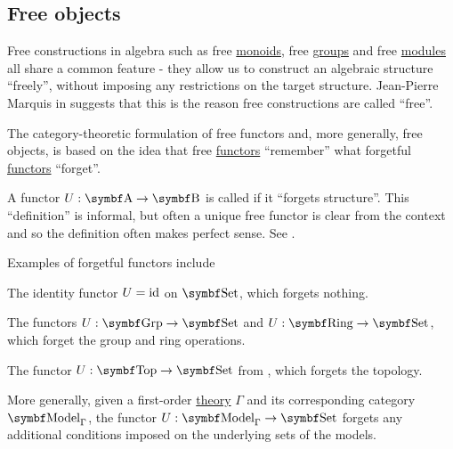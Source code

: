 \subsection{Free objects}\label{subsec:free_objects}

\begin{remark}\label{remark:free_construction_etymology}
  Free constructions in algebra such as free \hyperref[def:free_monoid]{monoids}, free \hyperref[def:free_group]{groups} and free \hyperref[def:free_left_module]{modules} all share a common feature - they allow us to construct an algebraic structure \enquote{freely}, without imposing any restrictions on the target structure. Jean-Pierre Marquis in \cite{StanfordPlato:category_theory} suggests that this is the reason free constructions are called \enquote{free}.

  The category-theoretic formulation of free functors and, more generally, free objects, is based on the idea that free \hyperref[def:free_functor]{functors} \enquote{remember} what forgetful \hyperref[def:forgetful_functor]{functors} \enquote{forget}.
\end{remark}

\begin{definition}\label{def:forgetful_functor}\cite[examples 1.2.3]{Leinster2014}
  A functor \( U: \Cat{A} \to \Cat{B} \) is called  if it \enquote{forgets structure}. This \enquote{definition} is informal, but often a unique free functor is clear from the context and so the definition often makes perfect sense. See .
\end{definition}

\begin{example}\label{ex:forgetful_functors}
  Examples of forgetful functors include

  \begin{defenum}
    \item The identity functor \( U = \operatorname{id} \) on \( \Cat{Set} \), which forgets nothing.
    \item The functors \( U: \Cat{Grp} \to \Cat{Set} \) and \( U: \Cat{Ring} \to \Cat{Set} \), which forget the group and ring operations.
    \item The functor \( U: \Cat{Top} \to \Cat{Set} \) from , which forgets the topology.
    \item More generally, given a first-order \hyperref[def:first_order_theory]{theory} \( \Gamma \) and its corresponding category \( \Cat{Model}_\Gamma \), the functor \( U: \Cat{Model}_\Gamma \to \Cat{Set} \) forgets any additional conditions imposed on the underlying sets of the models.
  \end{defenum}
\end{example}


